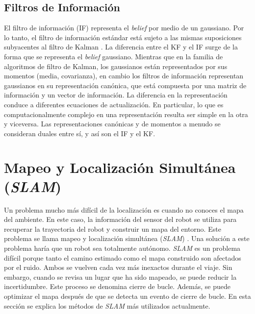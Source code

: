 \subsection{Filtros de Informaci\'on}
El filtro de informaci\'on (IF) representa el \textit{belief} por medio de un 
gaussiano. Por lo tanto, el filtro de informaci\'on est\'andar est\'a sujeto a las 
mismas suposiciones subyacentes al filtro de Kalman \cite{thrun2005multi}. La 
diferencia entre el KF y el IF surge de la forma que se representa el \textit{belief} 
gaussiano. Mientras que en la familia de algoritmos de filtro de Kalman, los 
gaussianos est\'an representados por sus momentos (media, covarianza), en cambio los 
filtros de informaci\'on representan gaussianos en su representaci\'on can\'onica, que 
est\'a compuesta por una matriz de informaci\'on y un vector de informaci\'on. La 
diferencia en la representaci\'on conduce a diferentes ecuaciones de 
actualizaci\'on. En particular, lo que es computacionalmente complejo en una 
representaci\'on resulta ser simple en la otra y viceversa. Las representaciones 
can\'onicas y de momentos a menudo se consideran duales entre s\'i, y as\'i son el 
IF y el KF.

\section{Mapeo y Localizaci\'on Simult\'anea (\textit{SLAM})}
Un problema mucho m\'as dif\'icil de la localizaci\'on es cuando no conoces el 
mapa del ambiente. En este caso, la informaci\'on del sensor del robot se utiliza 
para recuperar la trayectoria del robot y construir un mapa del entorno. Este problema 
se llama mapeo y localizaci\'on simult\'anea (\textit{SLAM}) \cite{Thrun2005}. Una 
soluci\'on a este problema har\'ia que un robot sea totalmente aut\'onomo. \textit{SLAM} 
es un problema dif\'icil porque tanto el camino estimado como el mapa construido son 
afectados por el ruido. Ambos se vuelven cada vez m\'as inexactos durante el viaje. Sin 
embargo, cuando se revisa un lugar que ha sido mapeado, se puede reducir la 
incertidumbre. Este proceso se denomina cierre de bucle. Adem\'as, se puede optimizar 
el mapa despu\'es de que se detecta un evento de cierre de bucle. En esta secci\'on se 
explica los m\'etodos de \textit{SLAM} m\'as utilizados actualmente.

